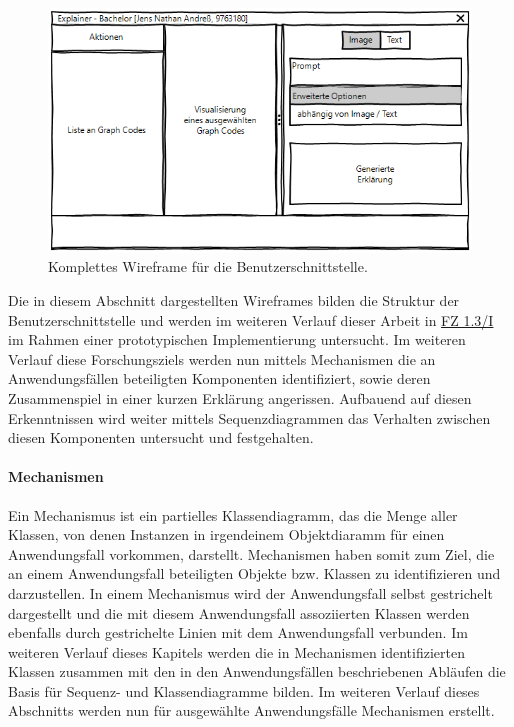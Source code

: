 \begin{figure}[htb]
    \centering
    \includegraphics[width=\textwidth]{chapter/chapter_3/wireframe-complete-stage.png}
    \caption{Komplettes Wireframe für die Benutzerschnittstelle.}
    \label{sec3:model:par:wireframe:fig:complete-stage}
\end{figure}
Die in diesem Abschnitt dargestellten Wireframes bilden die Struktur der Benutzerschnittstelle und werden im weiteren Verlauf dieser Arbeit in \hyperref[sec4:impl:subsec:fz-explainability]{FZ 1.3/I} im Rahmen einer prototypischen Implementierung untersucht.
Im weiteren Verlauf diese Forschungsziels werden nun mittels Mechanismen die an Anwendungsfällen beteiligten Komponenten identifiziert, sowie deren Zusammenspiel in einer kurzen Erklärung angerissen.
Aufbauend auf diesen Erkenntnissen wird weiter mittels Sequenzdiagrammen das Verhalten zwischen diesen Komponenten untersucht und festgehalten.

\FloatBarrier

\paragraph{Mechanismen}
\label{sec3:model:par:mechanism-use-cases}
Ein Mechanismus ist ein partielles Klassendiagramm, das die Menge aller Klassen, von denen Instanzen in irgendeinem Objektdiaramm für einen Anwendungsfall vorkommen, darstellt.
Mechanismen haben somit zum Ziel, die an einem Anwendungsfall beteiligten Objekte bzw. Klassen zu identifizieren und darzustellen.
In einem Mechanismus wird der Anwendungsfall selbst gestrichelt dargestellt und die mit diesem Anwendungsfall assoziierten Klassen werden ebenfalls durch gestrichelte Linien mit dem Anwendungsfall verbunden.
Im weiteren Verlauf dieses Kapitels werden die in Mechanismen identifizierten Klassen zusammen mit den in den Anwendungsfällen beschriebenen Abläufen die Basis für Sequenz- und Klassendiagramme bilden.
Im weiteren Verlauf dieses Abschnitts werden nun für ausgewählte Anwendungsfälle Mechanismen erstellt.

